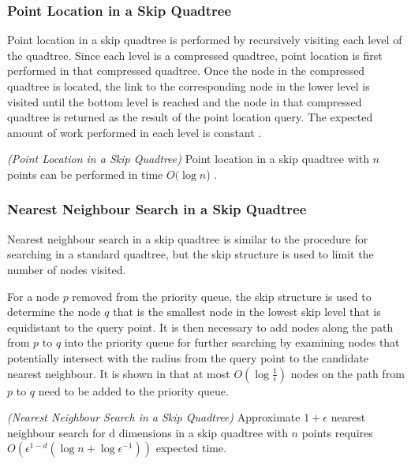 \documentclass[mcs]{scsthesis}
\begin{document}
\subsubsection{Point Location in a Skip Quadtree}

Point location in a skip quadtree is performed by recursively visiting each level
of the quadtree. Since each level is a compressed quadtree, point location is
first performed in that compressed quadtree. Once the node in the compressed
quadtree is located, the link to the corresponding node in the lower level
is visited until the bottom level is reached and the node in that compressed
quadtree is returned as the result of the point location query. The expected
amount of work performed in each level is constant \cite{skipquadtree}.

\begin{thm} \emph{(Point Location in a Skip Quadtree)} 
Point location in a skip quadtree with $n$ points can be performed in time
\(O(\log n\)) \cite{skipquadtree}. 
\end{thm}

\subsubsection{Nearest Neighbour Search in a Skip Quadtree}

Nearest neighbour search in a skip quadtree is similar to the procedure for
searching in a standard quadtree, but the skip structure is used to limit
the number of nodes visited.

For a node \(p\) removed from the priority queue, the skip structure is used to
determine the node \(q\) that is the smallest node in the lowest skip level
that is equidistant to the query point. It is then necessary to add nodes along
the path from \(p\) to \(q\) into the priority queue for further searching by
examining nodes that potentially intersect with the radius from the query point
to the candidate nearest neighbour. It is shown in \cite{skipquadtree}
that at most \(O(\log \frac{1}{\epsilon})\) nodes on the path from \(p\) to \(q\)
need to be added to the priority queue.

\begin{thm} \emph{(Nearest Neighbour Search in a Skip Quadtree)} 
Approximate \(1 + \epsilon\) nearest neighbour search for d dimensions in a skip
quadtree with $n$ points requires
\(O(\epsilon^{1 - d}(\log n + \log \epsilon^{-1}))\) expected time.
\end{thm}
\end{document}
